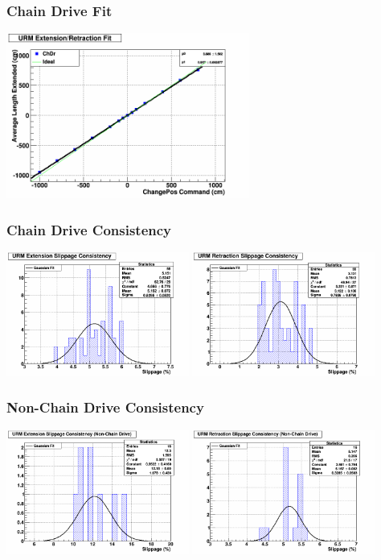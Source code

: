 \documentclass{beamer}
\begin{document}
\begin{frame}
\frametitle{Chain Drive Fit}
\centering\includegraphics[width=8cm]{FIT1.png}
\end{frame}
\begin{frame}
\frametitle{Chain Drive Consistency}
\centering\includegraphics[width=6cm]{Hist1.png}
\centering\includegraphics[width=6cm]{Hist2.png}
\end{frame}
\begin{frame}
\frametitle{Non-Chain Drive Consistency}
\centering\includegraphics[width=6cm]{Hist5.png}
\centering\includegraphics[width=6cm]{Hist6.png}
\end{frame}
\end{document}
